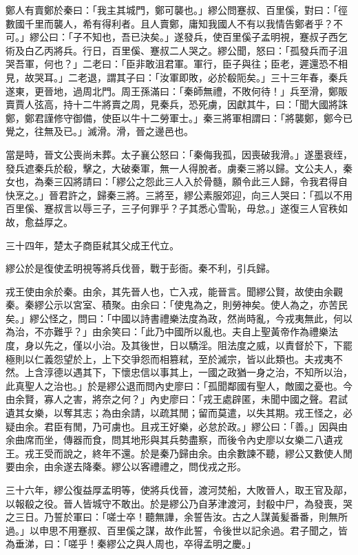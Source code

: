 \begin{pinyinscope}
鄭人有賣鄭於秦曰：「我主其城門，鄭可襲也。」繆公問蹇叔、百里傒，對曰：「徑數國千里而襲人，希有得利者。且人賣鄭，庸知我國人不有以我情告鄭者乎？不可。」繆公曰：「子不知也，吾已決矣。」遂發兵，使百里傒子孟明視，蹇叔子西乞術及白乙丙將兵。行日，百里傒、蹇叔二人哭之。繆公聞，怒曰：「孤發兵而子沮哭吾軍，何也？」二老曰：「臣非敢沮君軍。軍行，臣子與往；臣老，遲還恐不相見，故哭耳。」二老退，謂其子曰：「汝軍即敗，必於殽阨矣。」三十三年春，秦兵遂東，更晉地，過周北門。周王孫滿曰：「秦師無禮，不敗何待！」兵至滑，鄭販賣賈人弦高，持十二牛將賣之周，見秦兵，恐死虜，因獻其牛，曰：「聞大國將誅鄭，鄭君謹修守御備，使臣以牛十二勞軍士。」秦三將軍相謂曰：「將襲鄭，鄭今已覺之，往無及已。」滅滑。滑，晉之邊邑也。

當是時，晉文公喪尚未葬。太子襄公怒曰：「秦侮我孤，因喪破我滑。」遂墨衰绖，發兵遮秦兵於殽，擊之，大破秦軍，無一人得脫者。虜秦三將以歸。文公夫人，秦女也，為秦三囚將請曰：「繆公之怨此三人入於骨髓，願令此三人歸，令我君得自快烹之。」晉君許之，歸秦三將。三將至，繆公素服郊迎，向三人哭曰：「孤以不用百里傒、蹇叔言以辱三子，三子何罪乎？子其悉心雪恥，毋怠。」遂復三人官秩如故，愈益厚之。

三十四年，楚太子商臣弒其父成王代立。

繆公於是復使孟明視等將兵伐晉，戰于彭衙。秦不利，引兵歸。

戎王使由余於秦。由余，其先晉人也，亡入戎，能晉言。聞繆公賢，故使由余觀秦。秦繆公示以宮室、積聚。由余曰：「使鬼為之，則勞神矣。使人為之，亦苦民矣。」繆公怪之，問曰：「中國以詩書禮樂法度為政，然尚時亂，今戎夷無此，何以為治，不亦難乎？」由余笑曰：「此乃中國所以亂也。夫自上聖黃帝作為禮樂法度，身以先之，僅以小治。及其後世，日以驕淫。阻法度之威，以責督於下，下罷極則以仁義怨望於上，上下交爭怨而相篡弒，至於滅宗，皆以此類也。夫戎夷不然。上含淳德以遇其下，下懷忠信以事其上，一國之政猶一身之治，不知所以治，此真聖人之治也。」於是繆公退而問內史廖曰：「孤聞鄰國有聖人，敵國之憂也。今由余賢，寡人之害，將奈之何？」內史廖曰：「戎王處辟匿，未聞中國之聲。君試遺其女樂，以奪其志；為由余請，以疏其閒；留而莫遣，以失其期。戎王怪之，必疑由余。君臣有閒，乃可虜也。且戎王好樂，必怠於政。」繆公曰：「善。」因與由余曲席而坐，傳器而食，問其地形與其兵勢盡察，而後令內史廖以女樂二八遺戎王。戎王受而說之，終年不還。於是秦乃歸由余。由余數諫不聽，繆公又數使人閒要由余，由余遂去降秦。繆公以客禮禮之，問伐戎之形。

三十六年，繆公復益厚孟明等，使將兵伐晉，渡河焚船，大敗晉人，取王官及鄗，以報殽之役。晉人皆城守不敢出。於是繆公乃自茅津渡河，封殽中尸，為發喪，哭之三日。乃誓於軍曰：「嗟士卒！聽無譁，余誓告汝。古之人謀黃髪番番，則無所過。」以申思不用蹇叔、百里傒之謀，故作此誓，令後世以記余過。君子聞之，皆為垂涕，曰：「嗟乎！秦繆公之與人周也，卒得孟明之慶。」


\end{pinyinscope}
